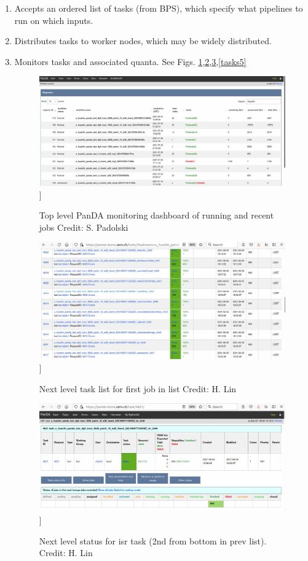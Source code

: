 \documentclass[DM,authoryear,toc]{lsstdoc}
\begin{document}
\begin{enumerate}

\item Accepts an ordered list of tasks (from BPS), which specify what
pipelines to run on which inputs.

\item Distributes tasks to worker nodes, which may be widely distributed.

\item Monitors tasks and associated quanta. See Figs. \ref{pandadash0},\ref{tasks1},\ref{tasks4},\ref{tasks5}

\begin{figure}
\includegraphics[width=\textwidth]{pandadash0.jpg}]
\caption{Top level PanDA monitoring dashboard of running and recent jobs
Credit: S. Padolski}
\label{pandadash0}
\end{figure}

\begin{figure}
\includegraphics[width=\textwidth]{tasks1.jpg}]
\caption{Next level task list for first job in list
Credit: H. Lin}
\label{tasks1}
\end{figure}

\begin{figure}
\includegraphics[width=\textwidth]{tasks4.jpg}]
\caption{Next level status for isr task (2nd from bottom in prev list).
Credit: H. Lin}
\label{tasks4}
\end{figure}


\end{enumerate}
\end{document}
